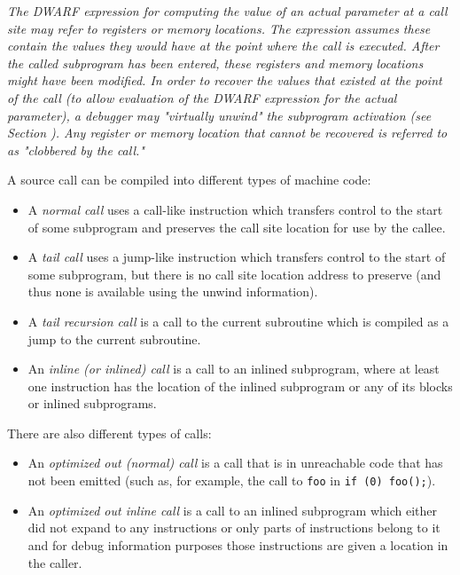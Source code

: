 \textit{The DWARF expression for computing the value of an actual parameter at
a call site may refer to registers or memory locations.  The expression
assumes these contain the values they would have at the point where the
call is executed. After the called subprogram has been entered, these
registers and memory locations might have been modified.  In order to
recover the values that existed at the point of the call (to allow
evaluation of the DWARF expression for the actual parameter), a debugger
may "virtually unwind" the subprogram activation 
(see Section ). Any
register or memory location that cannot be recovered is referred to as
"clobbered by the call."}
\eb

\bbpareb

A source call can be compiled into different types of machine code:
\begin{itemize}
\item
A \textit{normal call} uses a call-like instruction which transfers 
control to the start of some subprogram and preserves the call site 
\bb
location for use by the callee.
\eb  
\item
A \textit{tail call} uses a jump-like instruction which
transfers control to the start of some subprogram, but 
\bb
there is no call site location address to preserve
(and thus none is available using the unwind information). 
\eb 
\item
A \textit{tail recursion call} is a call
to the current subroutine which is compiled as a jump 
to the current subroutine.
\item
An \textit{inline (or inlined) call} is a call to an inlined subprogram,
where at least one instruction has the location of the inlined subprogram
or any of its blocks or inlined subprograms. 
\end{itemize}

There are also different types of  calls:
\begin{itemize}
\item
An \textit{optimized out (normal) call} is a call that is in unreachable code that 
has not been emitted (such as, for example, the call to \texttt{foo} in 
\texttt{if (0) foo();}).  
\item
An \textit{optimized out inline call}
is a call to an inlined subprogram which either did not expand to any instructions
or only parts of instructions belong to it and for debug information purposes those
instructions are given a location in the caller.
\end{itemize}

